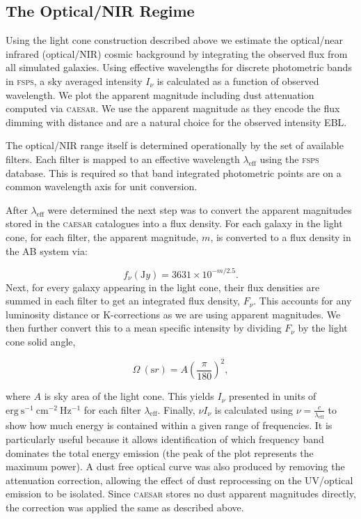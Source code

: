 \documentclass[
    a4paper, %
    10pt, %
    unnumberedsections, %
]{LTJournalArticle}
\begin{document}
\subsection{The Optical/NIR Regime}

Using the light cone construction described above we estimate the optical/near infrared (optical/NIR) cosmic background by integrating the observed flux from all simulated galaxies. Using effective wavelengths for discrete photometric bands in \textsc{fsps}, a sky averaged intensity $I_\nu$ is calculated as a function of observed wavelength. We plot the apparent magnitude including dust attenuation computed via \textsc{caesar}. We use the apparent magnitude as they encode the flux dimming with distance and are a natural choice for the observed intensity EBL.

The optical/NIR range itself is determined operationally by the set of available filters. Each filter is mapped to an effective wavelength $\lambda_{\mathrm{eff}}$ using the \textsc{fsps} database. This is required so that band integrated photometric points are on a common wavelength axis for unit conversion. 

After $\lambda_{\mathrm{eff}}$ were determined the next step was to convert the apparent magnitudes stored in the \textsc{caesar} catalogues into a flux density. For each galaxy in the light cone, for each filter, the apparent magnitude, $m$, is converted to a flux density in the AB system via:

\begin{equation}
    f_\nu({\mathrm Jy}) = 3631 \times 10^{-m/2.5}.
\end{equation}
\noindent Next, for every galaxy appearing in the light cone, their flux densities are summed in each filter to get an integrated flux density, $F_\nu$. This accounts for any luminosity distance or K-corrections as we are using apparent magnitudes. We then further convert this to a mean specific intensity by dividing $F_\nu$ by the light cone solid angle,

\begin{equation}
    \Omega\ ({\mathrm sr}) = A\left(\frac{\pi}{180}\right)^2,
    \label{eq:solidAngle}
\end{equation}

\noindent where $A$ is sky area of the light cone. This yields $I_\nu$ presented in units of $\mathrm{erg\ s^{-1}\ cm^{-2}\ Hz^{-1}}$ for each filter $\lambda_\mathrm{eff}$. Finally, $\nu I_\nu$ is calculated using $\nu =\frac{c}{\lambda_{\mathrm{eff}}}$ to show how much energy is contained within a given range of frequencies. It is particularly useful because it allows identification of which frequency band dominates the total energy emission (the peak of the plot represents the maximum power). A dust free optical curve was also produced by removing the attenuation correction, allowing the effect of dust reprocessing on the UV/optical emission to be isolated. Since \textsc{caesar} stores no dust apparent magnitudes directly, the correction was applied the same as described above.
\end{document}
